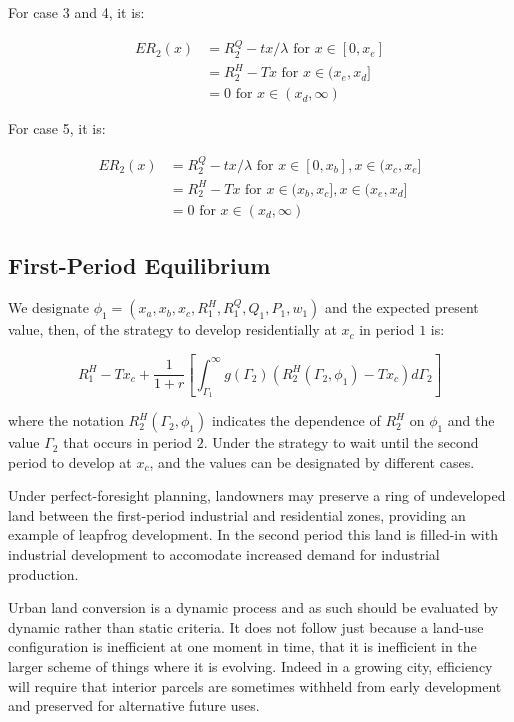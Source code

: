 For case 3 and 4, it is:

\begin{equation*}
    \begin{aligned}
        ER_2(x) & = R_2^Q - tx / \lambda \text{ for } x \in [0, x_e] \\
        & = R_2^H - Tx \text{ for } x \in (x_e, x_d] \\
        & = 0 \text{ for } x \in (x_d, \infty)
    \end{aligned}
\end{equation*}

For case 5, it is:

\begin{equation*}
    \begin{aligned}
        ER_2(x) & = R_2^Q - tx / \lambda \text{ for } x \in [0, x_b], x \in (x_c, x_e] \\
        & = R_2^H - Tx \text{ for } x \in (x_b, x_c], x \in (x_e, x_d] \\
        & = 0 \text{ for } x \in (x_d, \infty)
    \end{aligned}
\end{equation*}

\subsection{First-Period Equilibrium}

We designate $\phi_1 = (x_a, x_b, x_c, R_1^H, R_1^Q, Q_1, P_1, w_1)$ and the expected present value, then, of the strategy to develop residentially at $x_c$ in period $1$ is:

\begin{equation}
    R_1^H - Tx_c + \frac{1}{1 + r}[\int_{\Gamma_1}^\infty g(\Gamma_2)(R_2^H(\Gamma_2, \phi_1) - Tx_c) d\Gamma_2]
\end{equation}

where the notation $R_2^H(\Gamma_2, \phi_1)$ indicates the dependence of $R_2^H$ on $\phi_1$ and the value $\Gamma_2$ that occurs in period $2$. Under the strategy to wait until the second period to develop at $x_c$, and the values can be designated by different cases.

Under perfect-foresight planning, landowners may preserve a ring of undeveloped land between the first-period industrial and residential zones, providing an example of leapfrog development. In the second period this land is filled-in with industrial development to accomodate increased demand for industrial production.

Urban land conversion is a dynamic process and as such should be evaluated by dynamic rather than static criteria. It does not follow just because a land-use configuration is inefficient at one moment in time, that it is inefficient in the larger scheme of things where it is evolving. Indeed in a growing city, efficiency will require that interior parcels are sometimes withheld from early development and preserved for alternative future uses.